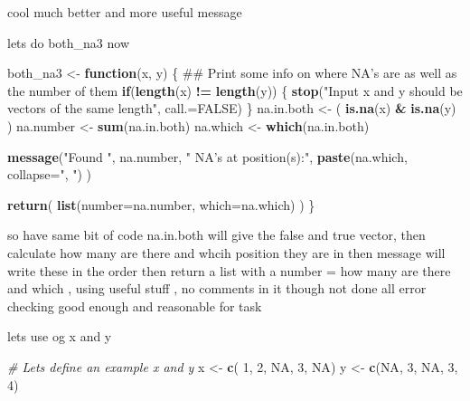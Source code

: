 \documentclass[]{article}
\newenvironment{Shaded}{\begin{snugshade}}{\end{snugshade}}
\newcommand{\KeywordTok}[1]{\textcolor[rgb]{0.13,0.29,0.53}{\textbf{#1}}}
\newcommand{\DataTypeTok}[1]{\textcolor[rgb]{0.13,0.29,0.53}{#1}}
\newcommand{\DecValTok}[1]{\textcolor[rgb]{0.00,0.00,0.81}{#1}}
\newcommand{\StringTok}[1]{\textcolor[rgb]{0.31,0.60,0.02}{#1}}
\newcommand{\CommentTok}[1]{\textcolor[rgb]{0.56,0.35,0.01}{\textit{#1}}}
\newcommand{\OtherTok}[1]{\textcolor[rgb]{0.56,0.35,0.01}{#1}}
\newcommand{\ControlFlowTok}[1]{\textcolor[rgb]{0.13,0.29,0.53}{\textbf{#1}}}
\newcommand{\OperatorTok}[1]{\textcolor[rgb]{0.81,0.36,0.00}{\textbf{#1}}}
\newcommand{\NormalTok}[1]{#1}
\begin{document}
cool much better and more useful message

lets do both\_na3 now

\begin{Shaded}
\begin{Highlighting}[]
\NormalTok{both_na3 <-}\StringTok{ }\ControlFlowTok{function}\NormalTok{(x, y) \{}
\NormalTok{  ## Print some info on where NA's are as well as the number of them }
  \ControlFlowTok{if}\NormalTok{(}\KeywordTok{length}\NormalTok{(x) }\OperatorTok{!=}\StringTok{ }\KeywordTok{length}\NormalTok{(y)) \{}
    \KeywordTok{stop}\NormalTok{(}\StringTok{"Input x and y should be vectors of the same length"}\NormalTok{, }\DataTypeTok{call.=}\OtherTok{FALSE}\NormalTok{)}
\NormalTok{  \}}
\NormalTok{  na.in.both <-}\StringTok{ }\NormalTok{( }\KeywordTok{is.na}\NormalTok{(x) }\OperatorTok{&}\StringTok{ }\KeywordTok{is.na}\NormalTok{(y) )}
\NormalTok{  na.number  <-}\StringTok{ }\KeywordTok{sum}\NormalTok{(na.in.both)}
\NormalTok{  na.which   <-}\StringTok{ }\KeywordTok{which}\NormalTok{(na.in.both)}

  \KeywordTok{message}\NormalTok{(}\StringTok{"Found "}\NormalTok{, na.number, }\StringTok{" NA's at position(s):"}\NormalTok{, }
          \KeywordTok{paste}\NormalTok{(na.which, }\DataTypeTok{collapse=}\StringTok{", "}\NormalTok{) ) }
  
  \KeywordTok{return}\NormalTok{( }\KeywordTok{list}\NormalTok{(}\DataTypeTok{number=}\NormalTok{na.number, }\DataTypeTok{which=}\NormalTok{na.which) )}
\NormalTok{\}}
\end{Highlighting}
\end{Shaded}

so have same bit of code na.in.both will give the false and true vector,
then calculate how many are there and whcih position they are in then
message will write these in the order then return a list with a number =
how many are there and which , using useful stuff , no comments in it
though not done all error checking good enough and reasonable for task

lets use og x and y

\begin{Shaded}
\begin{Highlighting}[]
\CommentTok{# Lets define an example x and y}
\NormalTok{x <-}\StringTok{ }\KeywordTok{c}\NormalTok{( }\DecValTok{1}\NormalTok{, }\DecValTok{2}\NormalTok{, }\OtherTok{NA}\NormalTok{, }\DecValTok{3}\NormalTok{, }\OtherTok{NA}\NormalTok{)}
\NormalTok{y <-}\StringTok{ }\KeywordTok{c}\NormalTok{(}\OtherTok{NA}\NormalTok{, }\DecValTok{3}\NormalTok{, }\OtherTok{NA}\NormalTok{, }\DecValTok{3}\NormalTok{, }\DecValTok{4}\NormalTok{)}
\end{Highlighting}
\end{Shaded}
\end{document}
